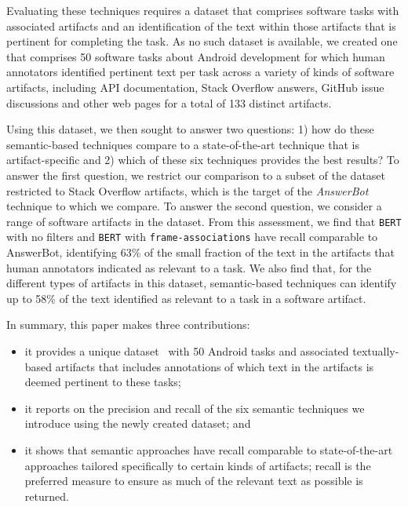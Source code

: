 Evaluating these techniques requires
a dataset that comprises software tasks with
associated  artifacts and an identification
of the text within those artifacts that
is pertinent for completing the task.
As no such dataset is available, we
created one that comprises  50 software tasks about Android development for
which human annotators identified pertinent text per task across a variety of kinds of software
artifacts, including API documentation, Stack Overflow answers,
GitHub issue discussions and other web pages for a total of 133 distinct artifacts.





Using this dataset, we then sought to answer
two questions: 1) how do these semantic-based
techniques compare to a state-of-the-art
technique that is artifact-specific and 2) which
of these six techniques provides the best
results? To answer the first question,
we restrict our comparison to a subset
of the dataset restricted to Stack Overflow
artifacts, which is the target of the \textit{AnswerBot} technique to which we
compare. To answer the second question,
we consider a range of software artifacts
in the dataset.
From this assessment, we find that \texttt{BERT} with no filters and \texttt{BERT} with \texttt{frame-associations} have recall comparable to AnswerBot,
identifying 63\% of the small fraction of the text in the artifacts that human annotators indicated as relevant to a task.
We also find that, for the different types of artifacts in this dataset, semantic-based techniques can identify up to 58\%
of the text identified as relevant to a task
in a software artifact.


In summary, this paper makes three contributions:



\begin{itemize}
    \item it provides a unique dataset~\cite{supplementary_material} with 50 Android tasks and associated textually-based artifacts
    that includes annotations of which text in the artifacts is deemed pertinent to these tasks;
    \item it reports on the precision and recall of the six semantic techniques we introduce
    using the newly created dataset; and
    \item it shows that semantic approaches have recall comparable to state-of-the-art approaches
    tailored specifically to certain kinds of artifacts; recall is the preferred measure to ensure as much of the relevant text as possible is returned.
\end{itemize}


